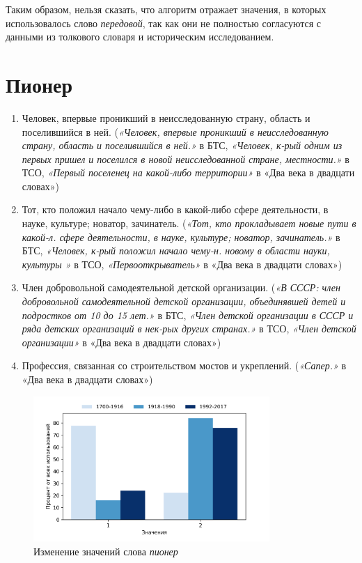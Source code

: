 Таким образом, нельзя сказать, что алгоритм отражает значения, в которых использовалось
слово \textit{передовой}, так как они не полностью согласуются
с данными из толкового словаря и историческим исследованием.

\section*{Пионер}

\begin{enumerate}
    \item Человек, впервые проникший в неисследованную страну, область и поселившийся в ней.
(\textit{«Человек, впервые проникший в неисследованную страну, область и поселившийся в ней.»} в БТС,
\textit{«Человек, к-рый одним из первых пришел и поселился в новой неисследованной стране, местности.»} в ТСО,
\textit{«Первый поселенец на какой-либо территории»} в «Два века в двадцати словах»)

    \item Тот, кто положил начало чему-либо в какой-либо сфере деятельности, в науке, культуре; новатор, зачинатель.
(\textit{«Тот, кто прокладывает новые пути в какой-л. сфере деятельности, в науке, культуре; новатор, зачинатель.»} в БТС,
\textit{«Человек, к-рый положил начало чему-н. новому в области науки, культуры »} в ТСО,
\textit{«Первооткрыватель»} в «Два века в двадцати словах»)

    \item Член добровольной самодеятельной детской организации.
(\textit{«В СССР: член добровольной самодеятельной детской организации, объединявшей детей и подростков от 10 до 15 лет.»} в БТС,
\textit{«Член детской организации в СССР и ряда детских организаций в нек-рых других странах.»} в ТСО,
\textit{«Член детской организации»} в «Два века в двадцати словах»)

    \item Профессия, связанная со строительством мостов и укреплений.
(\textit{«Сапер.»} в «Два века в двадцати словах»)
\end{enumerate}

\begin{figure}[H]
	\centering
	\includegraphics[width=0.8\textwidth]{img/visualizations/pioner_minimal}
	\caption{Изменение значений слова \textit{пионер}}
	\label{fig:Пионер}
\end{figure}

